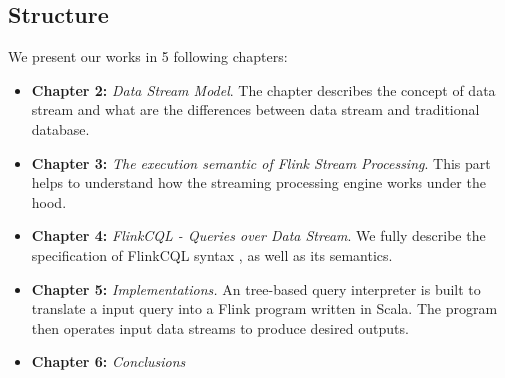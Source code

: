 \subsection*{Structure}
We present our works in 5 following chapters:
\begin{itemize}
	\item \textbf{Chapter 2:} \textit{Data Stream Model}. The chapter describes the concept of data stream and what are the differences between data stream and traditional database. 
	
	\item \textbf{Chapter 3:} \textit{The execution semantic of  Flink Stream Processing}. This part helps to understand how the streaming processing engine works under the hood.
	
	\item \textbf{Chapter 4:} \textit{FlinkCQL - Queries over Data Stream}. We fully describe the specification of FlinkCQL syntax , as well as its semantics.
	
	\item \textbf{Chapter 5:} \textit{Implementations.} An tree-based query interpreter is built to translate a input query into a Flink program written in Scala. The program then operates input data streams to produce desired outputs.
	
	\item \textbf{Chapter 6:} \textit{Conclusions}
\end{itemize}

